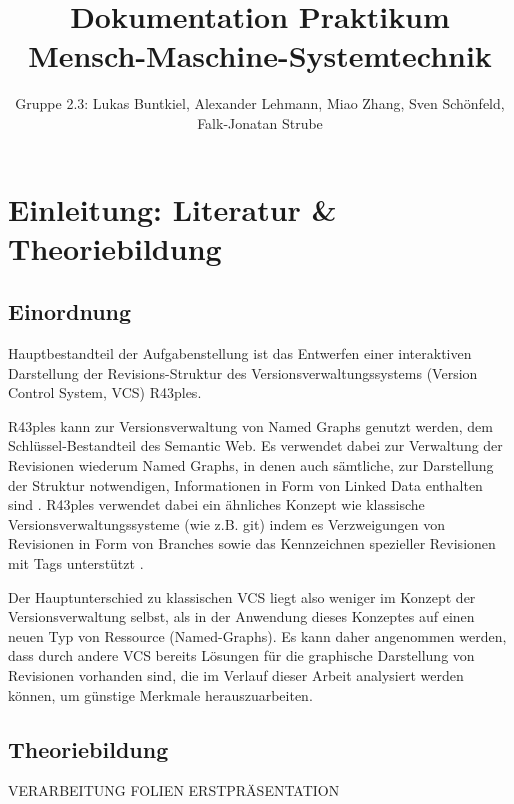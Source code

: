 \documentclass[color, ddc]{tudscrreprt}
\begin{document}
    \title{Dokumentation Praktikum Mensch-Maschine-Systemtechnik}
    \author{Gruppe 2.3:
    Lukas Buntkiel, 
    Alexander Lehmann, 
    Miao Zhang, 
    Sven Schönfeld,
    Falk-Jonatan Strube}
    \maketitle

\tableofcontents

\chapter{Einleitung: Literatur \& Theoriebildung}

\section{Einordnung}

Hauptbestandteil der Aufgabenstellung ist das Entwerfen einer interaktiven Darstellung der Revisions-Struktur des Versionsverwaltungssystems (Version Control System, VCS) R43ples.

R43ples kann zur Versionsverwaltung von Named Graphs genutzt werden, dem Schlüs\-sel-Be\-stand\-teil des Semantic Web\cite{pascal:semanic-web}. Es verwendet dabei zur Verwaltung der Revisionen wiederum Named Graphs, in denen auch sämtliche, zur Darstellung der Struktur notwendigen, Informationen in Form von Linked Data enthalten sind \cite{graube:r43ples}. R43ples verwendet dabei ein ähnliches Konzept wie klassische Versionsverwaltungssysteme (wie z.B. git\cite{url:git-scm}) indem es Verzweigungen von Revisionen in Form von Branches sowie das Kennzeichnen spezieller Revisionen mit Tags unterstützt \cite{graube:r43ples}.

Der Hauptunterschied zu klassischen VCS liegt also weniger im Konzept der Versionsverwaltung selbst, als in der Anwendung dieses Konzeptes auf einen neuen Typ von Ressource (Named-Graphs). Es kann daher angenommen werden, dass durch andere VCS bereits Lösungen für die graphische Darstellung von Revisionen vorhanden sind, die im Verlauf dieser Arbeit analysiert werden können, um günstige Merkmale herauszuarbeiten.

\section{Theoriebildung}

VERARBEITUNG FOLIEN ERSTPRÄSENTATION
    
\end{document}
